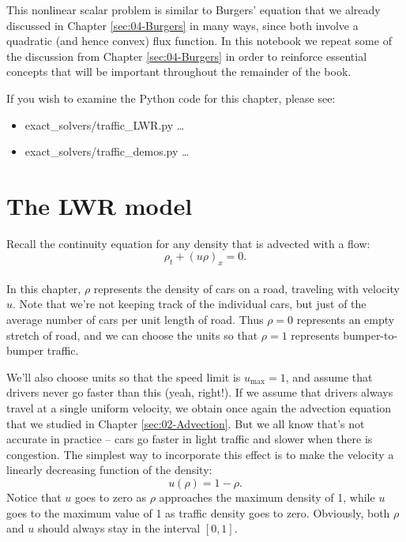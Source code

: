 \documentclass{SIAMbook2016}
\providecommand{\tightlist}{%
      \setlength{\itemsep}{0pt}\setlength{\parskip}{0pt}}
\begin{document}
This nonlinear scalar problem is similar to Burgers' equation that we
already discussed in Chapter \ref{sec:04-Burgers} in many ways, since
both involve a quadratic (and hence convex) flux function. In this
notebook we repeat some of the discussion from
Chapter \ref{sec:04-Burgers} in order to reinforce essential concepts
that will be important throughout the remainder of the book.

If you wish to examine the Python code for this chapter, please see:

\begin{itemize}
\tightlist
\item
  {exact\_solvers/traffic\_LWR.py} \ldots{}
\item
  {exact\_solvers/traffic\_demos.py} \ldots{}
\end{itemize}

\hypertarget{the-lwr-model}{%
\section{The LWR model}\label{the-lwr-model}}

Recall the continuity equation for any density that is advected with a
flow: \[\rho_t + (u\rho)_x = 0.\]\\
In this chapter, \(\rho\) represents the density of cars on a road,
traveling with velocity \(u\). Note that we're not keeping track of the
individual cars, but just of the average number of cars per unit length
of road. Thus \(\rho=0\) represents an empty stretch of road, and we can
choose the units so that \(\rho=1\) represents bumper-to-bumper traffic.

We'll also choose units so that the speed limit is \(u_\text{max}=1\),
and assume that drivers never go faster than this (yeah, right!). If we
assume that drivers always travel at a single uniform velocity, we
obtain once again the advection equation that we studied in
Chapter \ref{sec:02-Advection}. But we all know that's not accurate in
practice -- cars go faster in light traffic and slower when there is
congestion. The simplest way to incorporate this effect is to make the
velocity a linearly decreasing function of the density:
\[u(\rho) = 1 - \rho.\] Notice that \(u\) goes to zero as \(\rho\)
approaches the maximum density of 1, while \(u\) goes to the maximum
value of 1 as traffic density goes to zero. Obviously, both \(\rho\) and
\(u\) should always stay in the interval \([0,1]\).
\end{document}

